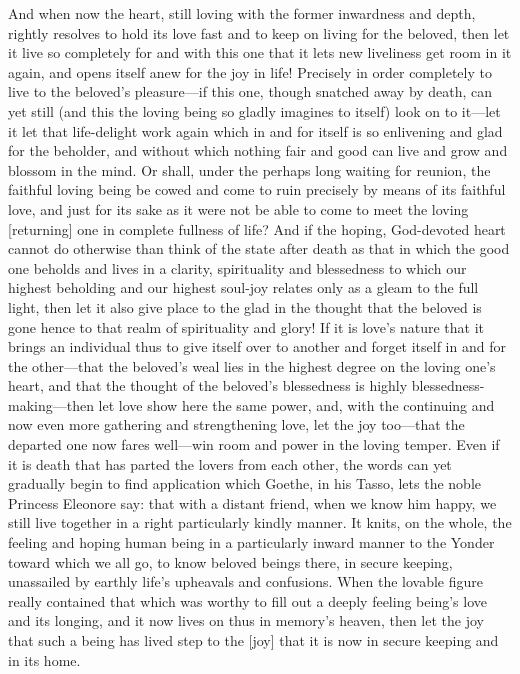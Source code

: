 \documentclass[12pt,a4paper]{book}
\begin{document}
And when now the heart, still loving with the former inwardness and depth,
rightly resolves to hold its love fast and to keep on living for the
beloved, then let it live so completely for and with this one that it lets
new liveliness get room in it again, and opens itself anew for the joy in
life! Precisely in order completely to live to the beloved's pleasure---if
this one, though snatched away by death, can yet still (and this the loving
being so gladly imagines to itself) look on to it---let it let that
life-delight work again which in and for itself is so enlivening and glad
for the beholder, and without which nothing fair and good can live and grow
and blossom in the mind. Or shall, under the perhaps long waiting for
reunion, the faithful loving being be cowed and come to ruin precisely by
means of its faithful love, and just for its sake as it were not be able to
come to meet the loving [returning] one in complete fullness of life? And
if the hoping, God-devoted heart cannot do otherwise than think of the
state after death as that in which the good one beholds and lives in a
clarity, spirituality and blessedness to which our highest beholding and our
highest soul-joy relates only as a gleam to the full light, then let it also
give place to the glad in the thought that the beloved is gone hence to that
realm of spirituality and glory! If it is love's nature that it brings an
individual thus to give itself over to another and forget itself in and for
the other---that the beloved's weal lies in the highest degree on the loving
one's heart, and that the thought of the beloved's blessedness is highly
blessedness-making---then let love show here the same power, and, with the
continuing and now even more gathering and strengthening love, let the joy
too---that the departed one now fares well---win room and power in the loving
temper. Even if it is death that has parted the lovers from each other, the
words can yet gradually begin to find application which Goethe, in his
Tasso, lets the noble Princess Eleonore say: that with a distant friend,
when we know him happy, we still live together in a right particularly
kindly manner. It knits, on the whole, the feeling and hoping human being in
a particularly inward manner to the Yonder toward which we all go, to know
beloved beings there, in secure keeping, unassailed by earthly life's
upheavals and confusions. When the lovable figure really contained that
which was worthy to fill out a deeply feeling being's love and its longing,
and it now lives on thus in memory's heaven, then let the joy that such a
being has lived step to the [joy] that it is now in secure keeping and in
its home.
\end{document}
